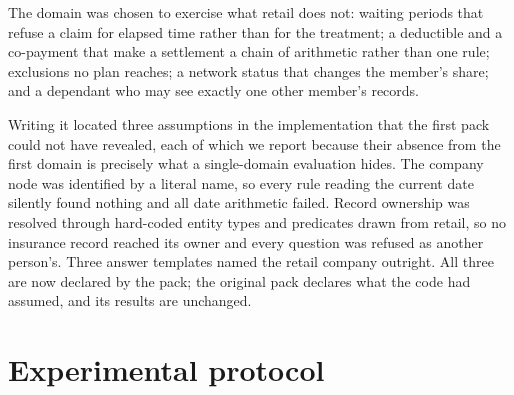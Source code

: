\documentclass[11pt]{article}
\begin{document}
The domain was chosen to exercise what retail does not: waiting periods that refuse a
claim for elapsed time rather than for the treatment; a deductible and a co-payment that
make a settlement a chain of arithmetic rather than one rule; exclusions no plan reaches;
a network status that changes the member's share; and a dependant who may see exactly one
other member's records.

Writing it located three assumptions in the implementation that the first pack could not
have revealed, each of which we report because their absence from the first domain is
precisely what a single-domain evaluation hides. The company node was identified by a
literal name, so every rule reading the current date silently found nothing and all date
arithmetic failed. Record ownership was resolved through hard-coded entity types and
predicates drawn from retail, so no insurance record reached its owner and every question
was refused as another person's. Three answer templates named the retail company outright.
All three are now declared by the pack; the original pack declares what the code had
assumed, and its results are unchanged.

\section{Experimental protocol}\label{sec:protocol}
\end{document}
